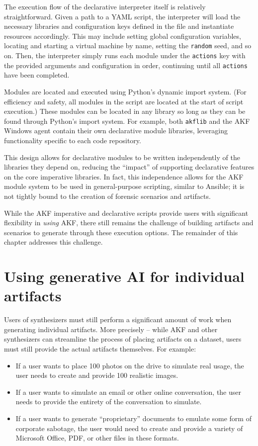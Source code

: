 \documentclass[letterpaper,12pt]{report}
\def\tightlist{}
\newcommand{\passthrough}[1]{#1}
\begin{document}
The execution flow of the declarative interpreter itself is relatively
straightforward. Given a path to a YAML script, the interpreter will
load the necessary libraries and configuration keys defined in the file
and instantiate resources accordingly. This may include setting global
configuration variables, locating and starting a virtual machine by
name, setting the \passthrough{\lstinline!random!} seed, and so on.
Then, the interpreter simply runs each module under the
\passthrough{\lstinline!actions!} key with the provided arguments and
configuration in order, continuing until all
\passthrough{\lstinline!actions!} have been completed.

Modules are located and executed using Python's dynamic import system.
(For efficiency and safety, all modules in the script are located at the
start of script execution.) These modules can be located in any library
so long as they can be found through Python's import system. For
example, both \passthrough{\lstinline!akflib!} and the AKF Windows agent
contain their own declarative module libraries, leveraging functionality
specific to each code repository.

This design allows for declarative modules to be written independently
of the libraries they depend on, reducing the ``impact'' of supporting
declarative features on the core imperative libraries. In fact, this
independence allows for the AKF module system to be used in
general-purpose scripting, similar to Ansible; it is not tightly bound
to the creation of forensic scenarios and artifacts.

While the AKF imperative and declarative scripts provide users with
significant flexibility in \emph{using} AKF, there still remains the
challenge of building artifacts and scenarios to generate through these
execution options. The remainder of this chapter addresses this
challenge.

\section{Using generative AI for individual
artifacts}\label{using-generative-ai-for-individual-artifacts}

Users of synthesizers must still perform a significant amount of work
when generating individual artifacts. More precisely -- while AKF and
other synthesizers can streamline the process of placing artifacts on a
dataset, users must still provide the actual artifacts themselves. For
example:

\begin{itemize}
\tightlist
\item
  If a user wants to place 100 photos on the drive to simulate real
  usage, the user needs to create and provide 100 realistic images.
\item
  If a user wants to simulate an email or other online conversation, the
  user needs to provide the entirety of the conversation to simulate.
\item
  If a user wants to generate ``proprietary'' documents to emulate some
  form of corporate sabotage, the user would need to create and provide
  a variety of Microsoft Office, PDF, or other files in these formats.
\end{itemize}
\end{document}

